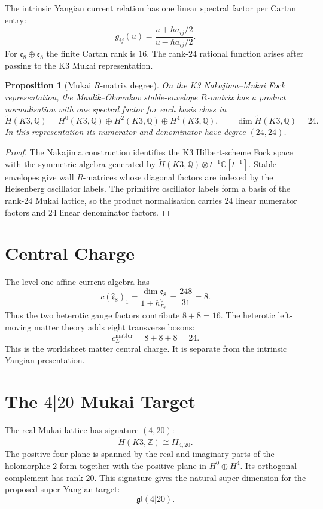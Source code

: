 \documentclass[11pt]{article}
\newtheorem{proposition}[theorem]{Proposition}
\providecommand{\C}{\mathbb{C}}
\providecommand{\Z}{\mathbb{Z}}
\providecommand{\Q}{\mathbb{Q}}
\begin{document}
The intrinsic Yangian current relation has one linear spectral factor
per Cartan entry:
\[
  g_{ij}(u)
  =
  \frac{u+\hbar a_{ij}/2}{u-\hbar a_{ij}/2}.
\]
For \(\mathfrak e_8\oplus\mathfrak e_8\) the finite Cartan rank is
\(16\).  The rank-\(24\) rational function arises after passing to the
K3 Mukai representation.

\begin{proposition}[Mukai \(R\)-matrix degree]
\label{prop:mukai-rmatrix-degree}
On the K3 Nakajima--Mukai Fock representation, the
Maulik--Okounkov stable-envelope \(R\)-matrix has a product
normalisation with one spectral factor for each basis class in
\[
  \widetilde H(K3,\Q)
  =
  H^0(K3,\Q)\oplus H^2(K3,\Q)\oplus H^4(K3,\Q),
  \qquad
  \dim \widetilde H(K3,\Q)=24 .
\]
In this representation its numerator and denominator have degree
\((24,24)\).
\end{proposition}

\begin{proof}
The Nakajima construction identifies the K3 Hilbert-scheme Fock space
with the symmetric algebra generated by
\(\widetilde H(K3,\Q)\otimes t^{-1}\C[t^{-1}]\).  Stable envelopes give
wall \(R\)-matrices whose diagonal factors are indexed by the Heisenberg
oscillator labels.  The primitive oscillator labels form a basis of the
rank-\(24\) Mukai lattice, so the product normalisation carries \(24\)
linear numerator factors and \(24\) linear denominator factors.
\end{proof}

\section{Central Charge}
\label{sec:central-charge}

The level-one affine current algebra has
\[
  c(\widehat{\mathfrak e}_8)_1
  =
  \frac{\dim\mathfrak e_8}{1+h^\vee_{E_8}}
  =
  \frac{248}{31}
  =
  8.
\]
Thus the two heterotic gauge factors contribute \(8+8=16\).  The
heterotic left-moving matter theory adds eight transverse bosons:
\[
  c_L^{\mathrm{matter}}=8+8+8=24 .
\]
This is the worldsheet matter central charge.  It is separate from the
intrinsic Yangian presentation.

\section{The \(4|20\) Mukai Target}
\label{sec:4-20-target}

The real Mukai lattice has signature \((4,20)\):
\[
  \widetilde H(K3,\Z)\cong II_{4,20}.
\]
The positive four-plane is spanned by the real and imaginary parts of
the holomorphic \(2\)-form together with the positive plane in
\(H^0\oplus H^4\).  Its orthogonal complement has rank \(20\).  This
signature gives the natural super-dimension for the proposed
super-Yangian target:
\[
  \mathfrak{gl}(4|20).
\]
\end{document}

